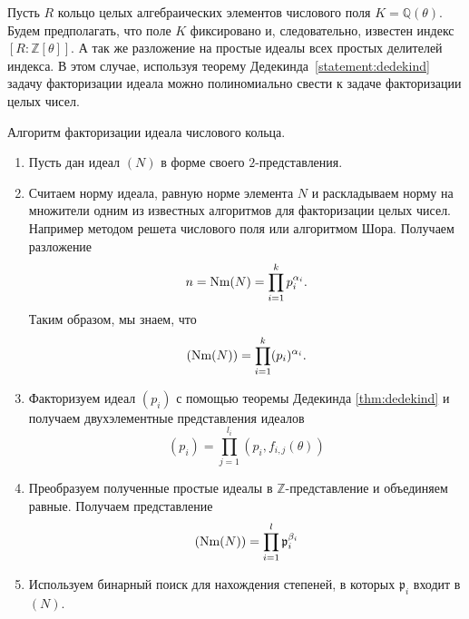 \documentclass[_00_dissertation.tex]{subfiles}
\begin{document}
Пусть $R$ кольцо целых алгебраических элементов числового поля $K = \mathbb{Q}(\theta)$.
Будем предполагать, что поле $K$ фиксировано и, следовательно, известен индекс $[R: \mathbb{Z}[\theta]]$.
А так же разложение на простые идеалы всех простых делителей индекса.
В этом случае, используя теорему Дедекинда~\ref{statement:dedekind} задачу факторизации идеала можно полиномиально свести к задаче факторизации целых чисел.

\begin{algorithm}
    Алгоритм факторизации идеала числового кольца.

    \begin{enumerate}
        \item Пусть дан идеал $(N)$ в форме своего $2$-представления.
        
        \item Считаем норму идеала, равную норме элемента $N$ и раскладываем норму на множители одним из известных алгоритмов для факторизации целых чисел.
        Например методом решета числового поля или алгоритмом Шора.
        Получаем разложение
        \begin{equation*}
            n = \textrm{Nm}(N) = \prod_{i=1}^{k} p_i^{\alpha_i}.
        \end{equation*}
        Таким образом, мы знаем, что
        \begin{equation*}
            (\textrm{Nm}(N)) = \prod_{i=1}^{k} (p_i)^{\alpha_i}.
        \end{equation*}
    
        \item Факторизуем идеал $(p_i)$ с помощью теоремы Дедекинда \ref{thm:dedekind} и получаем двухэлементные представления идеалов
        \begin{equation*}
            (p_i) = \prod_{j=1}^{l_i} (p_i, f_{i, j}(\theta))
        \end{equation*}
    
        \item Преобразуем полученные простые идеалы в $\mathbb{Z}$-представление и объединяем равные.
        Получаем представление
        \begin{equation*}
            (\textrm{Nm}(N)) = \prod_{i=1}^{l} \mathfrak{p}_i^{\beta_i}
        \end{equation*}
    
        \item Используем бинарный поиск для нахождения степеней, в которых $\mathfrak{p}_i$ входит в $(N)$.
    \end{enumerate}
\end{algorithm}
\end{document}
